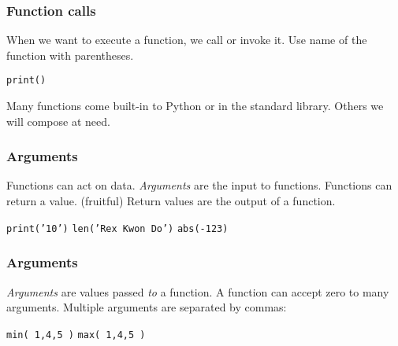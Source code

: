 \documentclass[11pt]{beamer}
\begin{document}
\begin{frame}
  \frametitle{Function calls}
  \Enlarge

  \begin{itemize}
  \myitem  When we want to execute a function, we call or invoke it. \pause
  \myitem  Use name of the function with parentheses. \pause
    \begin{itemize}
    \mysubitem  \texttt{print()}
    \end{itemize} \pause
  \myitem  Many functions come built-in to Python or in the standard library. \pause
  \myitem  Others we will compose at need.
  \end{itemize}
\end{frame}

\begin{frame}
  \frametitle{Arguments}
  \Enlarge

  \begin{itemize}
  \myitem  Functions can act on data. \pause
  \myitem  \emph{Arguments} are the input to functions. \pause
  \myitem  Functions can return a value.  (fruitful) \pause
  \myitem  Return values are the output of a function. \pause
    \begin{itemize}
    \mysubitem  \texttt{print('10')} \pause
    \mysubitem  \texttt{len('Rex Kwon Do')} \pause
    \mysubitem  \texttt{abs(-123)} \pause
    \end{itemize}
  \end{itemize}
\end{frame}

\begin{frame}
  \frametitle{Arguments}
  \Enlarge

  \begin{itemize}
  \myitem  \emph{Arguments} are values passed \emph{to} a function. \pause
  \myitem  A function can accept zero to many arguments. \pause
  \myitem  Multiple arguments are separated by commas:
    \begin{itemize}
    \mysubitem  \texttt{min( 1,4,5 )}
    \mysubitem  \texttt{max( 1,4,5 )}
    \end{itemize}
  \end{itemize}
\end{frame}
\end{document}
